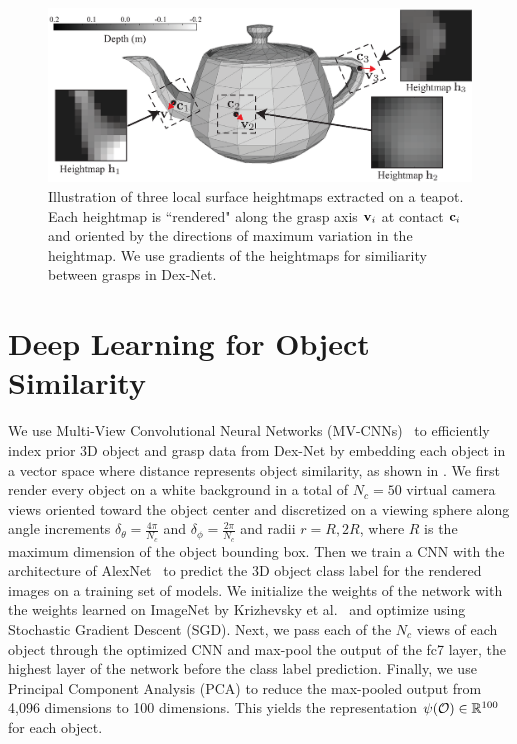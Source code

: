 \begin{figure}[t!]
\centering
\includegraphics[scale=0.30]{figures/illustrations/local_feature_model.eps}
\caption{Illustration of three local surface heightmaps extracted on a teapot. Each heightmap is ``rendered" along the grasp axis $\mathbf{v}_i$ at contact $\mathbf{c}_i$ and oriented by the directions of maximum variation in the heightmap.  We use gradients of the heightmaps for similiarity between grasps in Dex-Net.}
\vspace*{-15pt}
\end{figure}

\section{Deep Learning for Object Similarity}
We use Multi-View Convolutional Neural Networks (MV-CNNs)~\cite{su2015multi} to efficiently index prior 3D object and grasp data from Dex-Net by embedding each object in a vector space where distance represents object similarity, as shown in .
We first render every object on a white background in a total of $N_c = 50$ virtual camera views oriented toward the object center and discretized on a viewing sphere along angle increments $\delta_{\theta} = \frac{4 \pi}{N_c}$ and $\delta_{\phi} = \frac{2 \pi}{N_c}$ and radii $r = R, 2R$, where $R$ is the maximum dimension of the object bounding box.
Then we train a CNN with the architecture of AlexNet~\cite{krizhevsky2012imagenet} to predict the 3D object class label for the rendered images on a training set of models. 
We initialize the weights of the network with the weights learned on ImageNet by Krizhevsky et al.~\cite{krizhevsky2012imagenet} and optimize using Stochastic Gradient Descent (SGD). 
Next, we pass each of the $N_c$ views of each object through the optimized CNN and max-pool the output of the fc7 layer, the highest layer of the network before the class label prediction. 
Finally, we use Principal Component Analysis (PCA) to reduce the max-pooled output from 4,096 dimensions to 100 dimensions.
This yields the representation $\psi(\mathcal{O}) \in \mathbb{R}^{100}$ for each object.

